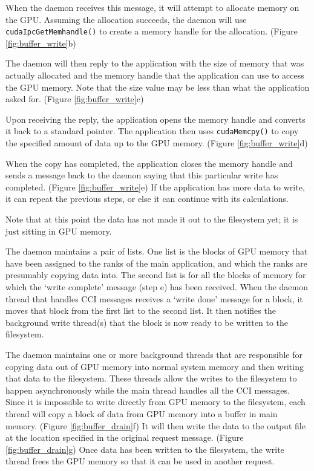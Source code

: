 When the daemon receives this message, it will attempt to allocate memory on the GPU.  Assuming the allocation succeeds, the daemon will use \texttt{cudaIpcGetMemhandle()} to create a memory handle for the allocation. (Figure \ref{fig:buffer_write}b)

The daemon will then reply to the application with the size of memory that was actually allocated and the memory handle that the application can use to access the GPU memory.  Note that the size value may be less than what the application asked for. (Figure \ref{fig:buffer_write}c)

Upon receiving the reply, the application opens the memory handle and converts it back to a standard pointer.  The application then uses \texttt{cudaMemcpy()} to copy the specified amount of data up to the GPU memory. (Figure \ref{fig:buffer_write}d) 

When the copy has completed, the application closes the memory handle and sends a message back to the daemon saying that this particular write has completed.  (Figure \ref{fig:buffer_write}e)  If the application has more data to write, it can repeat the previous steps, or else it can continue with its calculations.

Note that at this point the data has not made it out to the filesystem yet; it is just sitting in GPU memory.  

The daemon maintains a pair of lists.  One list is the blocks of GPU memory that have been assigned to the ranks of the main application, and which the ranks are presumably copying data into.  The second list is for all the blocks of memory for which the `write complete' message (step e) has been received.  When the daemon thread that handles CCI messages receives a `write done' message for a block, it moves that block from the first list to the second list.  It then notifies the background write thread(s) that the block is now ready to be written to the filesystem.

The daemon maintains one or more background threads that are responsible for copying data out of GPU memory into normal system memory and then writing that data to the filesystem.  These threads allow the writes to the filesystem to happen asynchronously while the main thread handles all the CCI messages.  Since it is impossible to write directly from GPU memory to the filesystem, each thread will copy a block of data from GPU memory into a buffer in main memory.  (Figure \ref{fig:buffer_drain}f)  It will then write the data to the output file at the location specified in the original request message.  (Figure \ref{fig:buffer_drain}g)  Once data has been written to the filesystem, the write thread frees the GPU memory so that it can be used in another request.


